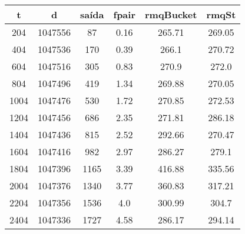 \begin{tabular}{|c|c|c|c|c|c|}
\hline
\textbf{t} & \textbf{d} & \textbf{saída} & \textbf{fpair} & \textbf{rmqBucket} & \textbf{rmqSt}\\
\hline
204 & 1047556 & 87 & 0.16 & 265.71 & 269.05\\
\hline
404 & 1047536 & 170 & 0.39 & 266.1 & 270.72\\
\hline
604 & 1047516 & 305 & 0.83 & 270.9 & 272.0\\
\hline
804 & 1047496 & 419 & 1.34 & 269.88 & 270.05\\
\hline
1004 & 1047476 & 530 & 1.72 & 270.85 & 272.53\\
\hline
1204 & 1047456 & 686 & 2.35 & 271.81 & 286.18\\
\hline
1404 & 1047436 & 815 & 2.52 & 292.66 & 270.47\\
\hline
1604 & 1047416 & 982 & 2.97 & 286.27 & 279.1\\
\hline
1804 & 1047396 & 1165 & 3.39 & 416.88 & 335.56\\
\hline
2004 & 1047376 & 1340 & 3.77 & 360.83 & 317.21\\
\hline
2204 & 1047356 & 1536 & 4.0 & 300.99 & 304.7\\
\hline
2404 & 1047336 & 1727 & 4.58 & 286.17 & 294.14\\
\hline
\end{tabular}

